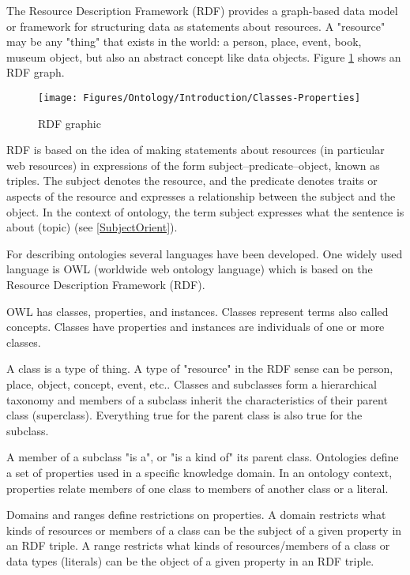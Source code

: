 The Resource Description Framework (RDF) provides a graph-based data model or framework for structuring data as statements about resources. A "resource" may be any "thing" that exists in the world: a person, place, event, book, museum object, but also an abstract concept like data objects. Figure \ref{fig:classes-properties}  shows an RDF graph.

\begin{figure}[h]
	\centering
	\texttt{[image: Figures/Ontology/Introduction/Classes-Properties]}
	\caption[RDF graphic]{RDF graphic}
	\label{fig:classes-properties}
\end{figure}

RDF is based on the idea of making statements about resources (in particular web resources) in expressions of the form subject–predicate–object, known as triples. The subject denotes the resource, and the predicate denotes traits or aspects of the resource and expresses a relationship between the subject and the object. In the context of ontology, the term subject expresses what the sentence is about (topic) (see \ref{SubjectOrient}).

For describing ontologies several languages have been developed. One widely used language is OWL (worldwide web ontology language) which is based on the Resource Description Framework (RDF).

OWL has classes, properties, and instances. Classes represent terms also called concepts. Classes have properties and instances are individuals of one or more classes.

A class is a type of thing. A type of "resource" in the RDF sense can be
person, place, object, concept, event, etc.. Classes and subclasses form a hierarchical taxonomy and members of a subclass inherit the characteristics of their parent class (superclass). Everything true for the parent class is also true for the subclass.

A member of a subclass "is a", or "is a kind of" its parent class. Ontologies define a set of properties used in a specific knowledge domain. In an ontology context, properties relate members of one class to members of another class or a literal.

Domains and ranges define restrictions on properties. A domain restricts what kinds of resources or members of a class can be the subject of a given property in an RDF triple. A range restricts what kinds of resources/members of a class or data types (literals) can be the object of a given property in an RDF triple.

